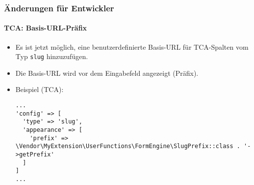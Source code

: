 
\begin{frame}[fragile]
	\frametitle{Änderungen für Entwickler}
	\framesubtitle{TCA: Basis-URL-Präfix}

	\lstset{basicstyle=\tiny\ttfamily}

	\begin{itemize}

		\item Es ist jetzt möglich, eine benutzerdefinierte Basis-URL für TCA-Spalten vom Typ \texttt{slug} hinzuzufügen.
		\item Die Basis-URL wird vor dem Eingabefeld angezeigt (Präfix).
		\item Beispiel (TCA):

\vspace{-0.4cm}
\begin{lstlisting}
...
'config' => [
  'type' => 'slug',
  'appearance' => [
    'prefix' => \Vendor\MyExtension\UserFunctions\FormEngine\SlugPrefix::class . '->getPrefix'
  ]
]
...
\end{lstlisting}

	\end{itemize}

\end{frame}


